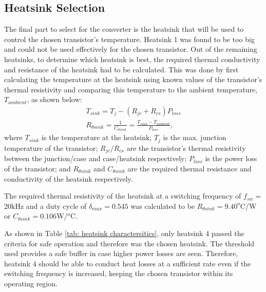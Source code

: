     \subsection{Heatsink Selection}
        The final part to select for the converter is the heatsink that will be used to control the chosen transistor's temperature. Heatsink 1 was found to be too big and could not be used effectively for the chosen transistor. Out of the remaining heatsinks, to determine which heatsink is best, the required thermal conductivity and resistance of the heatsink had to be calculated. This was done by first calculating the temperature at the heatsink using known values of the transistor's thermal resistivity and comparing this temperature to the ambient temperature, \(T_{ambient}\), as shown below:
        \begin{gather}
            T_{sink} = T_j - (R_{jc} + R_{cs})P_{loss} \\
            R_{\theta sink} = \frac{1}{C_{\theta sink}} = \frac{T_{sink} - T_{ambient}}{P_{loss}},
        \end{gather}
        where \(T_{sink}\) is the temperature at the heatsink; \(T_j\) is the max. junction temperature of the transistor; \(R_{jc}/R_{cs}\) are the transistor's thermal resistivity between the junction/case and case/heatsink respectively; \(P_{loss}\) is the power loss of the transistor; and \(R_{\theta sink}\) and \(C_{\theta sink}\) are the required thermal resistance and conductivity of the heatsink respectively.

        The required thermal resistivity of the heatsink at a switching frequency of \(f_{sw} = \) 20kHz and a duty cycle of \(\delta_{max} = 0.545\) was calculated to be \(R_{\theta sink} = 9.40^o\)C/W or \(C_{\theta sink} = 0.106 \)W/\(^o\)C.

        

        As shown in Table \ref{tab: heatsink charactersitics}, only heatsink 4 passed the criteria for safe operation and therefore was the chosen heatsink. The threshold used provides a safe buffer in case higher power losses are seen. Therefore, heatsink 4 should be able to conduct heat losses at a sufficient rate even if the switching frequency is increased, keeping the chosen transistor within its operating region.

        